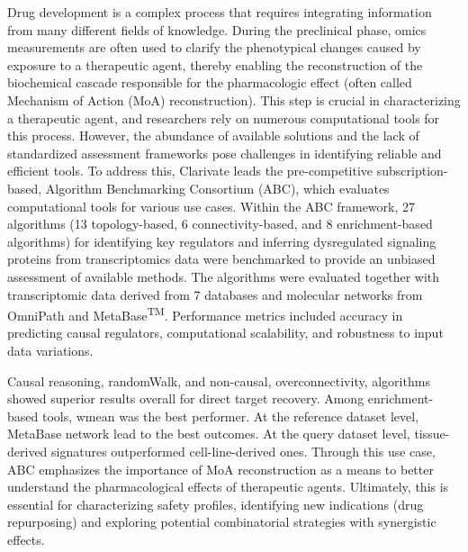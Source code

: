﻿%

%

Drug development is a complex process that requires integrating information from many different fields of knowledge.
During the preclinical phase, omics measurements are often used to clarify the phenotypical changes caused by exposure to a therapeutic agent, thereby enabling the reconstruction of the biochemical cascade responsible for the pharmacologic effect (often called Mechanism of Action (MoA) reconstruction).
This step is crucial in characterizing a therapeutic agent, and researchers rely on numerous computational tools for this process.
However, the abundance of available solutions and the lack of standardized assessment frameworks pose challenges in identifying reliable and efficient tools.
To address this, Clarivate leads the pre-competitive subscription-based, Algorithm Benchmarking Consortium (ABC), which evaluates computational tools for various use cases.
Within the ABC framework, 27 algorithms (13 topology-based, 6 connectivity-based, and 8 enrichment-based algorithms) for identifying key regulators and inferring dysregulated signaling proteins from transcriptomics data were benchmarked to provide an unbiased assessment of available methods.
The algorithms were evaluated together with transcriptomic data derived from 7 databases and molecular networks from OmniPath and  MetaBase\textsuperscript{TM}.
Performance metrics included accuracy in predicting causal regulators, computational scalability, and robustness to input data variations.

Causal reasoning, randomWalk, and non-causal, overconnectivity, algorithms showed superior results overall for direct target recovery. Among enrichment-based tools, wmean was the best performer.
At the reference dataset level, MetaBase network lead to the best outcomes. At the query dataset level, tissue-derived signatures outperformed cell-line-derived ones.
Through this use case, ABC emphasizes the importance of MoA reconstruction as a means to better understand the pharmacological effects of therapeutic agents.
Ultimately, this is essential for characterizing safety profiles, identifying new indications (drug repurposing) and exploring potential combinatorial strategies with synergistic effects.

